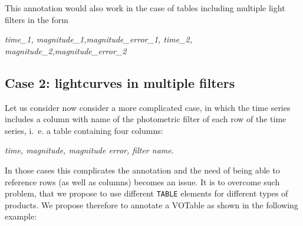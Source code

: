 \documentclass[11pt,a4paper]{ivoa}
\let\fg=\color
\def\elem#1{{\tt{\fg{DarkRed}#1}}}
\begin{document}
This annotation would also work in the case of tables including multiple light filters in the form
\begin{center}
   \emph{time\_1, magnitude\_1,magnitude\_error\_1, time\_2, magnitude\_2,magnitude\_error\_2}
\end{center}

\subsection{Case 2: lightcurves in multiple filters}
Let us consider now consider a more complicated case, in which the time series includes a column with name of the photometric filter of each row of the time series, i.~e. a table containing four columns:
\begin{center}
   \emph{time, magnitude, magnitude error, filter name}.
\end{center}
In those cases this complicates the annotation and the need of being able to reference rows (as well as columns) becomes an issue. It is to overcome such problem, that we propose to use different \elem{TABLE} elements for different types of products. We propose therefore to annotate a VOTable as shown in the following example: 

\begingroup

\endgroup    





%

\end{document}
